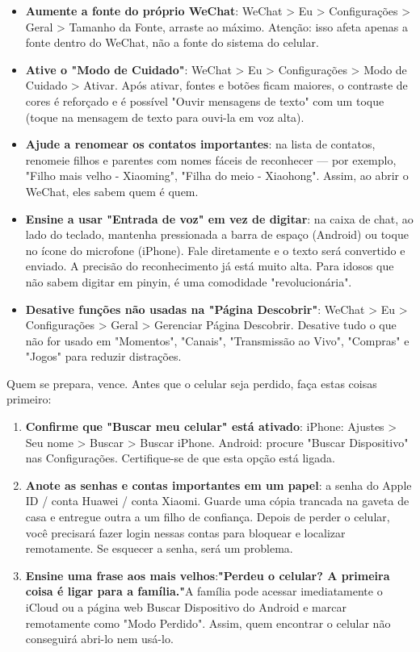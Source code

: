 \begin{itemize}
  \item \textbf{Aumente a fonte do próprio WeChat}: WeChat > Eu > Configurações > Geral > Tamanho da Fonte, arraste ao máximo. Atenção: isso afeta apenas a fonte dentro do WeChat, não a fonte do sistema do celular.
  \item \textbf{Ative o "Modo de Cuidado"}: WeChat > Eu > Configurações > Modo de Cuidado > Ativar. Após ativar, fontes e botões ficam maiores, o contraste de cores é reforçado e é possível "Ouvir mensagens de texto" com um toque (toque na mensagem de texto para ouvi-la em voz alta).
  \item \textbf{Ajude a renomear os contatos importantes}: na lista de contatos, renomeie filhos e parentes com nomes fáceis de reconhecer — por exemplo, "Filho mais velho - Xiaoming", "Filha do meio - Xiaohong". Assim, ao abrir o WeChat, eles sabem quem é quem.
  \item \textbf{Ensine a usar "Entrada de voz" em vez de digitar}: na caixa de chat, ao lado do teclado, mantenha pressionada a barra de espaço (Android) ou toque no ícone do microfone (iPhone). Fale diretamente e o texto será convertido e enviado. A precisão do reconhecimento já está muito alta. Para idosos que não sabem digitar em pinyin, é uma comodidade "revolucionária".
  \item \textbf{Desative funções não usadas na "Página Descobrir"}: WeChat > Eu > Configurações > Geral > Gerenciar Página Descobrir. Desative tudo o que não for usado em "Momentos", "Canais", "Transmissão ao Vivo", "Compras" e "Jogos" para reduzir distrações.
\end{itemize}


Quem se prepara, vence. Antes que o celular seja perdido, faça estas coisas primeiro:

\begin{enumerate}
  \item \textbf{Confirme que "Buscar meu celular" está ativado}: iPhone: Ajustes > Seu nome > Buscar > Buscar iPhone. Android: procure "Buscar Dispositivo" nas Configurações. Certifique-se de que esta opção está ligada.
  \item \textbf{Anote as senhas e contas importantes em um papel}: a senha do Apple ID / conta Huawei / conta Xiaomi. Guarde uma cópia trancada na gaveta de casa e entregue outra a um filho de confiança. Depois de perder o celular, você precisará fazer login nessas contas para bloquear e localizar remotamente. Se esquecer a senha, será um problema.
  \item \textbf{Ensine uma frase aos mais velhos}:\textbf{"Perdeu o celular? A primeira coisa é ligar para a família."}A família pode acessar imediatamente o iCloud ou a página web Buscar Dispositivo do Android e marcar remotamente como "Modo Perdido". Assim, quem encontrar o celular não conseguirá abri-lo nem usá-lo.
\end{enumerate}

